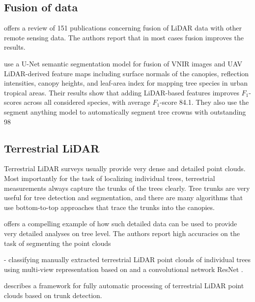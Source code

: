 \subsection{Fusion of data}

\cite{liFusionApproachesIndividual2023}

\cite{balestraLiDARDataFusion2024} offers a review of 151 publications concerning fusion of LiDAR data with other remote sensing data.
The authors report that in most cases fusion improves the results.

\cite{ferreiraImprovingUrbanTree2024} use a U-Net semantic segmentation model for fusion of VNIR images and UAV LiDAR-derived feature maps including surface normals of the canopies, reflection intensities, canopy heights, and leaf-area index for mapping tree species in urban tropical areas.
Their results show that adding LiDAR-based features improves $F_1$-scores across all considered species, with average $F_1$-score 84.1.
They also use the segment anything model \cite{Kirillov_2023_ICCV} to automatically segment tree crowns with outstanding 98%

\subsection{Terrestrial LiDAR}

Terrestrial LiDAR surveys usually provide very dense and detailed point clouds.
Most importantly for the task of localizing individual trees, terrestrial measurements always capture the trunks of the trees clearly.
Tree trunks are very useful for tree detection and segmentation, and there are many algorithms that use bottom-to-top approaches that trace the trunks into the canopies.

\cite{nurunnabiDevelopmentPreciseTree2024} offers a compelling example of how such detailed data can be used to provide very detailed analyses on tree level.
The authors report high accuracies on the task of segmenting the point clouds

\cite{allenTreeSpeciesClassification2022} - classifying manually extracted terrestrial LiDAR point clouds of individual trees using multi-view representation based on \cite{goyalRevisitingPointCloud2021} and a convolutional network ResNet \cite{heDeepResidualLearning2016}.

\cite{lopezserranoArtificialIntelligencebasedSoftware2022} describes a framework for fully automatic processing of terrestrial LiDAR point clouds based on trunk detection.

